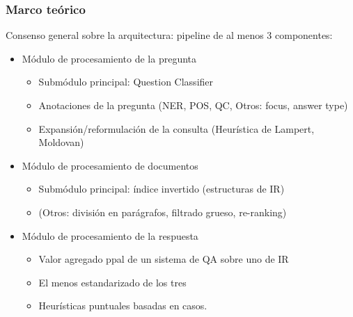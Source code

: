 \begin{frame}
\frametitle{Marco teórico}
  Consenso general sobre la arquitectura: pipeline de al menos 3 componentes:
  \begin{itemize}
    \item Módulo de procesamiento de la pregunta
    \begin{itemize}
      \item Submódulo principal: Question Classifier
      \item Anotaciones de la pregunta (NER, POS, QC, Otros: focus, answer type)
      \item Expansión/reformulación de la consulta (Heurística de Lampert, Moldovan)
    \end{itemize}
    \item Módulo de procesamiento de documentos
    \begin{itemize}
      \item Submódulo principal: índice invertido (estructuras de IR)
      \item (Otros: división en parágrafos, filtrado grueso, re-ranking)
    \end{itemize}
    \item Módulo de procesamiento de la respuesta
    \begin{itemize}
      \item Valor agregado ppal de un sistema de QA sobre uno de IR
      \item El menos estandarizado de los tres
      \item Heurísticas puntuales basadas en casos.
    \end{itemize}
  \end{itemize}

\end{frame}

